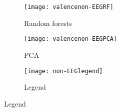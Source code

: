 \begin{figure}[!tbp]
  \begin{subfigure}[b]{0.3\textwidth}
    \texttt{[image: valencenon-EEGRF]}
    \caption{Random forests}
  \end{subfigure}
  \hfill
  \begin{subfigure}[b]{0.3\textwidth}
    \texttt{[image: valencenon-EEGPCA]} %
    \caption{PCA}
  \end{subfigure}
  \hfill
  \begin{subfigure}[b]{0.3\textwidth}
    \texttt{[image: non-EEGlegend]}
    \caption{Legend\label{valencepieslegend}}
  \end{subfigure}
\end{figure}
\clearpage

